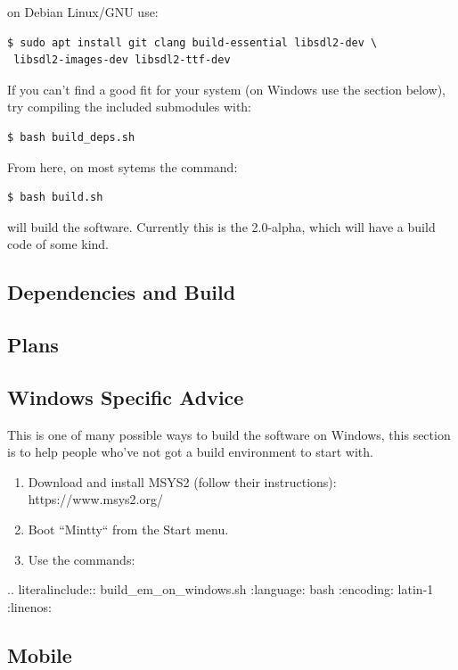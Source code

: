 \documentclass[10pt]{report}
\begin{document}
on Debian Linux/GNU use:

\begin{lstlisting}
$ sudo apt install git clang build-essential libsdl2-dev \
 libsdl2-images-dev libsdl2-ttf-dev
\end{lstlisting}

If you can't find a good fit for your system (on Windows use the section below),
try compiling the included submodules with:

\begin{lstlisting}
$ bash build_deps.sh
\end{lstlisting}

From here, on most sytems the command:

\begin{lstlisting}
$ bash build.sh
\end{lstlisting}

will build the software. Currently this is the 2.0-alpha, which will have a build code of
some kind.

\subsection{Dependencies and Build}

\subsection{Plans}

\subsection{Windows Specific Advice}

This is one of many possible ways to build the software on Windows,
this section is to help people who've not got a build environment to start with.

\begin{enumerate}
\item Download and install MSYS2 (follow their instructions): https://www.msys2.org/
\item Boot ``Mintty`` from the Start menu.
\item Use the commands:
\end{enumerate}

.. literalinclude:: build\_em\_on\_windows.sh
   :language: bash
   :encoding: latin-1
   :linenos:

\subsection{Mobile}
\end{document}
